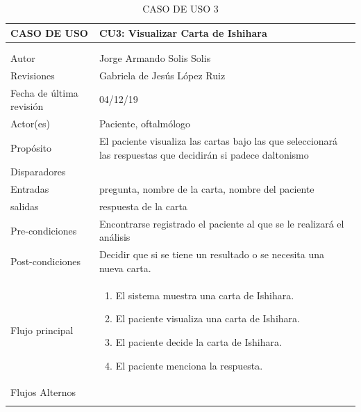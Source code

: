 \documentclass[10pt]{article}
\begin{document}
\begin{longtable}{|p{3.8cm}|p{10.8cm}|}
\hline
CASO DE USO & CU3: Visualizar Carta de Ishihara\\
\hline 
\endfirsthead

\hline

 & \\
\hline 
\endhead

\multicolumn{2}{c}{}
\endfoot

\endlastfoot
\hline
versión & 1\\
\hline
Autor & Jorge Armando Solis Solis\\
\hline
Revisiones & Gabriela de Jesús López Ruiz \\
\hline
Fecha de última revisión & 04/12/19\\
\hline
Actor(es) & Paciente, oftalmólogo \\
\hline
Propósito & El paciente visualiza las cartas bajo las que seleccionará las respuestas que decidirán si padece daltonismo\\
\hline
Disparadores & \\
\hline
Entradas & pregunta, nombre de la carta, nombre del paciente\\
\hline
salidas & respuesta de la carta\\
\hline
Pre-condiciones & Encontrarse registrado el paciente al que se le realizará el análisis \\
\hline
Post-condiciones & Decidir que si se tiene un resultado o se necesita una nueva carta. \\
\hline
Flujo principal & \begin{enumerate}
    \item El sistema muestra una carta de Ishihara.
    \item El paciente visualiza una carta de Ishihara.
    \item El paciente decide la carta de Ishihara.
    \item El paciente menciona la respuesta.
\end{enumerate}
    \\
\hline
Flujos Alternos & \\
\hline
\caption{CASO DE USO 3}
\label{tabla1}
\end{longtable}
\newpage
\end{document}
